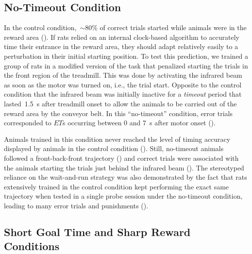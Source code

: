 \subsection{No-Timeout Condition}
\label{ch:time:nto}

In the control condition,~$\sim$80\% of correct trials started while animals were in the reward area ().
If rats relied on an internal clock-based algorithm to accurately time their entrance in the reward area, they should adapt relatively easily to a perturbation in their initial starting position.
To test this prediction, we trained a group of rats in a modified version of the task that penalized starting the trials in the front region of the treadmill.
This was done by activating the infrared beam as soon as the motor was turned on, i.e., the trial start.
Opposite to the control condition that the infrared beam was initially inactive for a \emph{timeout} period that lasted~1.5~s after treadmill onset to allow the animals to be carried out of the reward area by the conveyor belt.
In this ``no-timeout'' condition, error trials corresponded to $ET$s occurring between 0 and 7~s after motor onset ().

Animals trained in this condition never reached the level of timing accuracy displayed by animals in the control condition ().
Still, no-timeout animals followed a front-back-front trajectory () and correct trials were associated with the animals starting the trials just behind the infrared beam ().
The stereotyped reliance on the wait-and-run strategy was also demonstrated by the fact that rats extensively trained in the control condition kept performing the exact same trajectory when tested in a single probe session under the no-timeout condition, leading to many error trials and punishments ().


\subsection[Short GT \& Sharp Conditions]{Short Goal Time and Sharp Reward Conditions}
\label{ch:time:shortGT}

